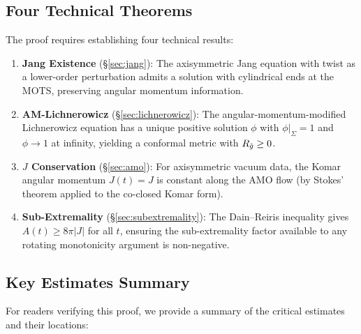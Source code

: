 \subsection{Four Technical Theorems}

The proof requires establishing four technical results:

\begin{enumerate}[label=(T\arabic*)]
    \item \textbf{Jang Existence} (\S\ref{sec:jang}): The axisymmetric Jang equation with twist as a lower-order perturbation admits a solution with cylindrical ends at the MOTS, preserving angular momentum information.
    
    \item \textbf{AM-Lichnerowicz} (\S\ref{sec:lichnerowicz}): The angular-momentum-modified Lichnerowicz equation has a unique positive solution $\phi$ with $\phi|_\Sigma = 1$ and $\phi \to 1$ at infinity, yielding a conformal metric with $R_{\tilde{g}} \geq 0$.
    
    \item \textbf{$J$ Conservation} (\S\ref{sec:amo}): For axisymmetric vacuum data, the Komar angular momentum $J(t) = J$ is constant along the AMO flow (by Stokes' theorem applied to the co-closed Komar form).
    
    \item \textbf{Sub-Extremality} (\S\ref{sec:subextremality}): The Dain--Reiris inequality \cite{dain2011} gives $A(t) \geq 8\pi|J|$ for all $t$, ensuring the sub-extremality factor available to any rotating monotonicity argument is non-negative.
\end{enumerate}

\subsection{Key Estimates Summary}

For readers verifying this proof, we provide a summary of the critical estimates and their locations:

